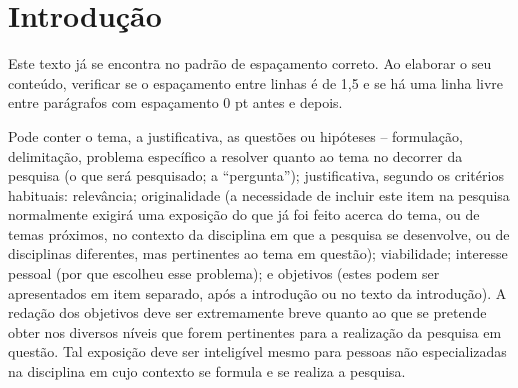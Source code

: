 \section{Introdução}

Este texto já se encontra no padrão de espaçamento correto. Ao elaborar o seu conteúdo, verificar se o espaçamento entre linhas é de 1,5 e se há uma linha livre entre parágrafos com espaçamento 0 pt antes e depois.

Pode conter o tema, a justificativa, as questões ou hipóteses – formulação, delimitação, problema específico a resolver quanto ao tema no decorrer da pesquisa (o que será pesquisado; a “pergunta”); justificativa, segundo os critérios habituais: relevância; originalidade (a necessidade de incluir este item na pesquisa normalmente exigirá uma exposição do que já foi feito acerca do tema, ou de temas próximos, no contexto da disciplina em que a pesquisa se desenvolve, ou de disciplinas diferentes, mas pertinentes ao tema em questão); viabilidade; interesse pessoal (por que escolheu esse problema); e objetivos (estes podem ser apresentados em item separado, após a introdução ou no texto da introdução). A redação dos objetivos deve ser extremamente breve quanto ao que se pretende obter nos diversos níveis que forem pertinentes para a realização da pesquisa em questão. Tal exposição deve ser inteligível mesmo para pessoas não especializadas na disciplina em cujo contexto se formula e se realiza a pesquisa. 
